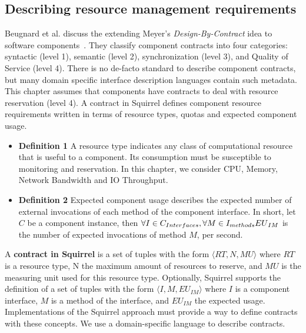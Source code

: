 \subsection{Describing resource management requirements}
Beugnard et al. discuss the extending Meyer's \textit{Design-By-Contract} idea to software components~\cite{Beugnard774917}.
They classify component contracts into four categories: syntactic (level 1), semantic (level 2), synchronization (level 3), and Quality of Service (level 4).
There is no de-facto standard to describe component contracts, but many domain specific interface description languages contain such metadata.
This chapter assumes that components have contracts to deal with resource reservation (level 4).
A contract in Squirrel defines component resource requirements written in terms of resource types, quotas and expected component usage.
\begin{itemize}
\item{\textbf{Definition 1}} A resource type indicates any class of computational resource that is useful to a component.
Its consumption must be susceptible to monitoring and reservation.
In this chapter, we consider CPU, Memory, Network Bandwidth and IO Throughput.

\item{\textbf{Definition 2}} Expected component usage describes the expected number of external invocations of each method of the component interface.
In short, let $C$ be a component instance, then $\forall{I \in C_{Interfaces}}, \forall{M \in I_{methods}} \\ {EU}_{IM}$ is the number of expected invocations of method $M$, per second.

\end{itemize}

A \textbf{contract in Squirrel} is a set of tuples with the form $\langle RT, N, MU \rangle$ where $RT$ is a resource type, N the maximum amount of resources to reserve, and $MU$ is the measuring unit used for this resource type.
Optionally, Squirrel supports the definition of a set of tuples with the form $\langle I, M, {EU}_{IM} \rangle$ where $I$ is a component interface, $M$ is a method of the interface, and ${EU}_{IM}$ the expected usage.
Implementations of the Squirrel approach must provide a way to define contracts with these concepts.
We use a domain-specific language to describe contracts.

